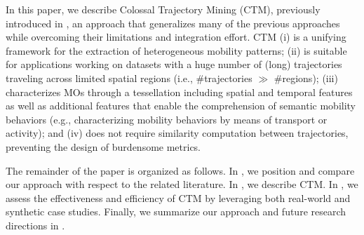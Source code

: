 \documentclass[
]{ceurart}
\begin{document}
In this paper, we describe Colossal Trajectory Mining (CTM), previously introduced in \cite{DBLP:journals/eswa/FranciaGG24}, an approach that generalizes many of the previous approaches while overcoming their limitations and integration effort.
CTM 
(i) is a unifying framework for the extraction of heterogeneous mobility patterns; 
(ii) is suitable for applications working on datasets with a huge number of (long) trajectories traveling across limited spatial regions (i.e., \#trajectories $\gg$ \#regions);
(iii) characterizes MOs through a tessellation including spatial and temporal features as well as additional features that enable the comprehension of semantic mobility behaviors \citep{DBLP:journals/tist/Yan0PSA13} (e.g., characterizing mobility behaviors by means of transport or activity);
and (iv) does not require similarity computation between trajectories, preventing the design of burdensome metrics.

The remainder of the paper is organized as follows.
In , we position and compare our approach with respect to the related literature.
In , we describe CTM.
In , we assess the effectiveness and efficiency of CTM by leveraging both real-world and synthetic case studies. 
Finally, we summarize our approach and future research directions in .
\end{document}

